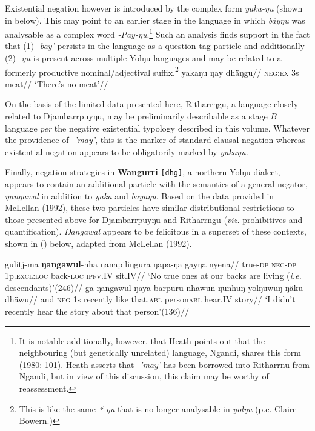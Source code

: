 \documentclass[10.5pt]{article}
\begin{document}
Existential negation however is introduced by the complex form \textit{yaka-ŋu} (shown in \nextx{} below). This may point to an earlier stage in the language in which \textit{bäyŋu} was analysable as a complex word \textit{-Pay-ŋu}.\footnote{It is notable additionally, however, that Heath points out that the neighbouring (but genetically unrelated) language, Ngandi, shares this form (1980: 101). Heath asserts that \textit{-'may'} has been borrowed into Ritharrnu from Ngandi, but in view of this discussion, this claim may be worthy of reassessment.} Such an analysis finds support in the fact that (1) \textit{-bay'} persists in the language as a question tag particle and additionally (2) \textit{-ŋu} is present across multiple Yolŋu languages and may be related to a formerly productive nominal/adjectival suffix.\footnote{This is like the same \textit{*-ŋu} that is no longer analysable in \textit{yolŋu} (p.c. Claire Bowern.)}
\ex
\begingl
\gla yakaŋu ŋay dhäŋgu//
\glb\textsc{neg:ex} 3s meat//
\glft`There's no meat'//
\endgl{}
\xe

On the basis of the limited data presented here, Ritharrŋgu, a language closely related to Djambarrpuyŋu, may be preliminarily describable as a stage $B$ language \textit{per} the negative existential typology described in this volume. Whatever the providence of \textit{-'may'}, this is the marker of standard clausal negation whereas existential negation appears to be obligatorily marked by \textit{yakaŋu.}

Finally, negation strategies in \textbf{Wangurri} {\tt[dhg]}, a northern Yolŋu dialect, appears to contain an additional particle with the semantics of a general negator, \textit{ŋangawal} in addition to \textit{yaka} and \textit{bayaŋu}. Based on the data provided in McLellan (1992), these two particles have similar distributional restrictions to those presented above for Djambarrpuyŋu and Ritharrngu (\textit{viz.} prohibitives and quantification). \textit{Ŋangawal} appears to be felicitous in a superset of these contexts, shown in (\nextx) below, adapted from McLellan (1992).

\pex\a\begingl\gla gulitj-ma \textbf{ŋangawul}-nha ŋanapiliŋgura ŋapa-ŋa gayŋa nyena//
\glb true-\textsc{dp} \textsc{neg-dp} 1p\textsc{.excl:loc} back\textsc{-loc} \textsc{ipfv.IV} sit.IV//
\glft`No true ones at our backs are living (\textit{i.e.} descendants)'\hfill(246)//
\endgl
\a\begingl\gla ga ŋangawul ŋaya barpuru nhawun ŋunhuŋ yolŋuwuŋ ŋäku dhäwu//
\glb and \textsc{neg} 1s recently like that.\textsc{abl} person\textsc{abl} hear\textsc{.IV} story//
\glft `I didn't recently hear the story about that person'\hfill (136)//
\endgl
\xe
\end{document}
